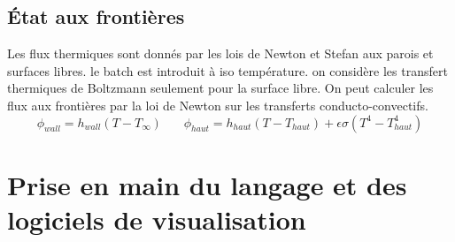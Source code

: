 \documentclass[12pt, a4paper, french, BCOR = 0pt, DIV = 10]{scrartcl}
\begin{document}
	\subsection{État aux frontières}
	
	Les flux thermiques sont donnés par les lois de Newton et Stefan aux parois et surfaces libres. le batch est introduit à iso température. on considère les transfert thermiques de Boltzmann seulement pour la surface libre.
	On peut calculer les flux aux frontières par la loi de Newton sur les transferts conducto-convectifs.\\ 
	\centering
	$$
	\phi_{wall} = h_{wall} (T - T_{\infty}) ~~~~~~~~	
	\phi_{haut} = h_{haut} (T - T_{haut}) + \epsilon \sigma (T^4 - T_{haut}^4)
	$$
	
	\section{Prise en main du langage et des logiciels de visualisation}
 
	
	
	
\end{document}

